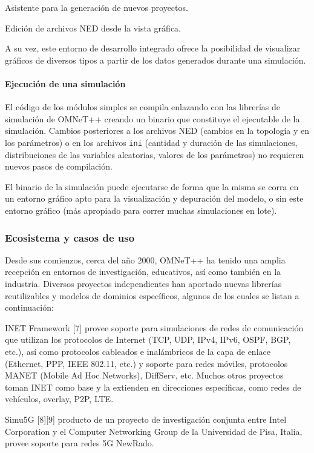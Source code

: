\documentclass[]{article}
\begin{document}
Asistente para la generación de nuevos proyectos.

Edición de archivos NED desde la vista gráfica.

A su vez, este entorno de desarrollo integrado ofrece la posibilidad de
visualizar gráficos de diversos tipos a partir de los datos generados durante
una simulación.

\paragraph{Ejecución de una simulación}

El código de los módulos simples se compila enlazando con las librerías de
simulación de OMNeT++ creando un binario que constituye el ejecutable de la
simulación. Cambios posteriores a los archivos NED (cambios en la topología y
en los parámetros) o en los archivos \verb!ini! (cantidad y duración de las
simulaciones, distribuciones de las variables aleatorias, valores de los
parámetros) no requieren nuevos pasos de compilación.

El binario de la simulación puede ejecutarse de forma que la misma se
corra en un entorno gráfico apto para la visualización y depuración del modelo,
o sin este entorno gráfico (más apropiado para correr muchas simulaciones en
lote).

\subsubsection{Ecosistema y casos de uso}

Desde sus comienzos, cerca del año 2000, OMNeT++ ha tenido una amplia recepción
en entornos de investigación, educativos, así como también en la industria.
Diversos proyectos independientes han aportado nuevas librerías reutilizables y
modelos de dominios específicos, algunos de los cuales se listan a
continuación:


INET Framework [7] provee soporte para simulaciones de redes de comunicación
que utilizan los protocolos de Internet (TCP, UDP, IPv4, IPv6, OSPF, BGP,
etc.), así como protocolos cableados e inalámbricos de la capa de enlace
(Ethernet, PPP, IEEE 802.11, etc.) y soporte para redes móviles, protocolos
MANET (Mobile Ad Hoc Networks), DiffServ, etc. Muchos otros proyectos toman
INET como base y la extienden en direcciones específicas, como redes de
vehículos, overlay, P2P, LTE.

Simu5G [8][9] producto de un proyecto de investigación conjunta entre Intel
Corporation y el Computer Networking Group de la Universidad de Pisa, Italia,
provee soporte para redes 5G NewRado.
\end{document}
